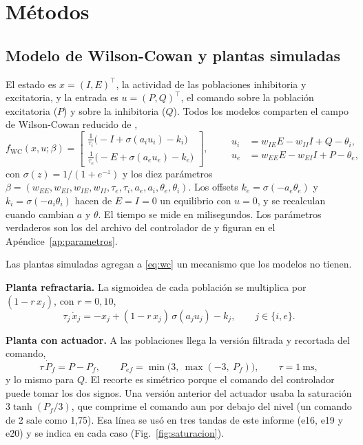 \documentclass[11pt,a4paper]{article}
\newcommand{\fwc}{f_{\mathrm{WC}}}
\begin{document}
\section{Métodos}

\subsection{Modelo de Wilson-Cowan y plantas simuladas}

El estado es $x = (I, E)^\top$, la actividad de las poblaciones inhibitoria y excitatoria, y la entrada es $u = (P, Q)^\top$, el comando sobre la población excitatoria ($P$) y sobre la inhibitoria ($Q$). Todos los modelos comparten el campo de Wilson-Cowan reducido de \cite{martinez2022ifac},
\begin{equation}
\fwc(x, u; \beta) =
\begin{bmatrix}
\tfrac{1}{\tau_i}\big(-I + \sigma(a_i u_i) - k_i\big)\\[3pt]
\tfrac{1}{\tau_e}\big(-E + \sigma(a_e u_e) - k_e\big)
\end{bmatrix},\qquad
\begin{aligned}
u_i &= w_{IE}E - w_{II}I + Q - \theta_i,\\
u_e &= w_{EE}E - w_{EI}I + P - \theta_e,
\end{aligned}
\label{eq:wc}
\end{equation}
con $\sigma(z) = 1/(1 + e^{-z})$ y los diez parámetros $\beta = (w_{EE}, w_{EI}, w_{IE}, w_{II}, \tau_e, \tau_i, a_e, a_i, \theta_e, \theta_i)$. Los offsets $k_e = \sigma(-a_e\theta_e)$ y $k_i = \sigma(-a_i\theta_i)$ hacen de $E = I = 0$ un equilibrio con $u = 0$, y se recalculan cuando cambian $a$ y $\theta$. El tiempo se mide en milisegundos. Los parámetros verdaderos son los del archivo del controlador de \cite{martinez2022ifac} y figuran en el Apéndice~\ref{ap:parametros}.

Las plantas simuladas agregan a \eqref{eq:wc} un mecanismo que los modelos no tienen.

\textbf{Planta refractaria.} La sigmoidea de cada población se multiplica por $(1 - r\,x_j)$, con $r = 0{,}10$,
\begin{equation}
\tau_j\,\dot x_j = -x_j + (1 - r\,x_j)\,\sigma(a_j u_j) - k_j, \qquad j \in \{i, e\}.
\label{eq:refrac}
\end{equation}

\textbf{Planta con actuador.} A las poblaciones llega la versión filtrada y recortada del comando,
\begin{equation}
\tau\,\dot P_f = P - P_f, \qquad P_{ef} = \min\big(3,\ \max(-3,\ P_f)\big), \qquad \tau = 1~\text{ms},
\label{eq:actuador}
\end{equation}
y lo mismo para $Q$. El recorte es simétrico porque el comando del controlador puede tomar los dos signos. Una versión anterior del actuador usaba la saturación $3\tanh(P_f/3)$, que comprime el comando aun por debajo del nivel (un comando de 2 sale como 1,75). Esa línea se usó en tres tandas de este informe (e16, e19 y e20) y se indica en cada caso (Fig.~\ref{fig:saturacion}).
\end{document}
